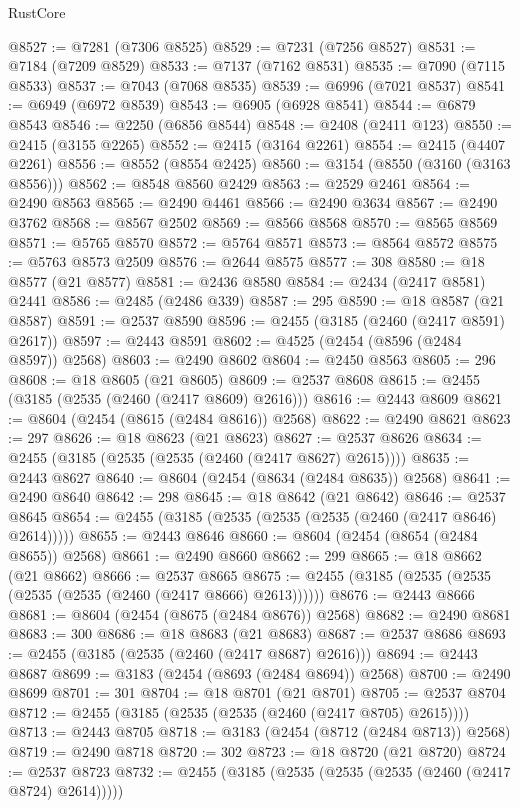 \begin{lexlean}{RustCore}
\begin{coremodule}
@8527 := @7281 (@7306 @8525)
@8529 := @7231 (@7256 @8527)
@8531 := @7184 (@7209 @8529)
@8533 := @7137 (@7162 @8531)
@8535 := @7090 (@7115 @8533)
@8537 := @7043 (@7068 @8535)
@8539 := @6996 (@7021 @8537)
@8541 := @6949 (@6972 @8539)
@8543 := @6905 (@6928 @8541)
@8544 := @6879 @8543
@8546 := @2250 (@6856 @8544)
@8548 := @2408 (@2411 @123)
@8550 := @2415 (@3155 @2265)
@8552 := @2415 (@3164 @2261)
@8554 := @2415 (@4407 @2261)
@8556 := @8552 (@8554 @2425)
@8560 := @3154 (@8550 (@3160 (@3163 @8556)))
@8562 := @8548 @8560 @2429
@8563 := @2529 @2461
@8564 := @2490 @8563
@8565 := @2490 @4461
@8566 := @2490 @3634
@8567 := @2490 @3762
@8568 := @8567 @2502
@8569 := @8566 @8568
@8570 := @8565 @8569
@8571 := @5765 @8570
@8572 := @5764 @8571
@8573 := @8564 @8572
@8575 := @5763 @8573 @2509
@8576 := @2644 @8575
@8577 := 308
@8580 := @18 @8577 (@21 @8577)
@8581 := @2436 @8580
@8584 := @2434 (@2417 @8581) @2441
@8586 := @2485 (@2486 @339)
@8587 := 295
@8590 := @18 @8587 (@21 @8587)
@8591 := @2537 @8590
@8596 := @2455 (@3185 (@2460 (@2417 @8591) @2617))
@8597 := @2443 @8591
@8602 := @4525 (@2454 (@8596 (@2484 @8597)) @2568)
@8603 := @2490 @8602
@8604 := @2450 @8563
@8605 := 296
@8608 := @18 @8605 (@21 @8605)
@8609 := @2537 @8608
@8615 := @2455 (@3185 (@2535 (@2460 (@2417 @8609) @2616)))
@8616 := @2443 @8609
@8621 := @8604 (@2454 (@8615 (@2484 @8616)) @2568)
@8622 := @2490 @8621
@8623 := 297
@8626 := @18 @8623 (@21 @8623)
@8627 := @2537 @8626
@8634 := @2455 (@3185 (@2535 (@2535 (@2460 (@2417 @8627) @2615))))
@8635 := @2443 @8627
@8640 := @8604 (@2454 (@8634 (@2484 @8635)) @2568)
@8641 := @2490 @8640
@8642 := 298
@8645 := @18 @8642 (@21 @8642)
@8646 := @2537 @8645
@8654 := @2455 (@3185 (@2535 (@2535 (@2535 (@2460 (@2417 @8646) @2614)))))
@8655 := @2443 @8646
@8660 := @8604 (@2454 (@8654 (@2484 @8655)) @2568)
@8661 := @2490 @8660
@8662 := 299
@8665 := @18 @8662 (@21 @8662)
@8666 := @2537 @8665
@8675 := @2455 (@3185 (@2535 (@2535 (@2535 (@2535 (@2460 (@2417 @8666) @2613))))))
@8676 := @2443 @8666
@8681 := @8604 (@2454 (@8675 (@2484 @8676)) @2568)
@8682 := @2490 @8681
@8683 := 300
@8686 := @18 @8683 (@21 @8683)
@8687 := @2537 @8686
@8693 := @2455 (@3185 (@2535 (@2460 (@2417 @8687) @2616)))
@8694 := @2443 @8687
@8699 := @3183 (@2454 (@8693 (@2484 @8694)) @2568)
@8700 := @2490 @8699
@8701 := 301
@8704 := @18 @8701 (@21 @8701)
@8705 := @2537 @8704
@8712 := @2455 (@3185 (@2535 (@2535 (@2460 (@2417 @8705) @2615))))
@8713 := @2443 @8705
@8718 := @3183 (@2454 (@8712 (@2484 @8713)) @2568)
@8719 := @2490 @8718
@8720 := 302
@8723 := @18 @8720 (@21 @8720)
@8724 := @2537 @8723
@8732 := @2455 (@3185 (@2535 (@2535 (@2535 (@2460 (@2417 @8724) @2614)))))

\end{coremodule}
\end{lexlean}
